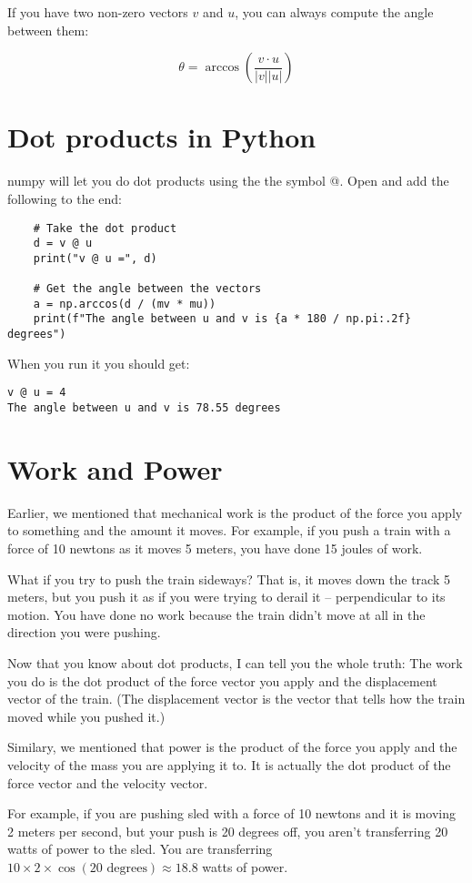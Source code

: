 If you have two non-zero vectors $v$ and $u$, you can always compute the angle between them:

$$\theta = \arccos(\frac{v \cdot u}{|v| |u|})$$

\section{Dot products in Python}

numpy will let you do dot products using the the symbol @.  Open  
and add the following to the end:

\begin{Verbatim}
    # Take the dot product
    d = v @ u
    print("v @ u =", d)
    
    # Get the angle between the vectors
    a = np.arccos(d / (mv * mu))
    print(f"The angle between u and v is {a * 180 / np.pi:.2f} degrees")    
\end{Verbatim}

When you run it you should get:
\begin{Verbatim}
v @ u = 4
The angle between u and v is 78.55 degrees
\end{Verbatim}

\section{Work and Power}

Earlier, we mentioned that mechanical work is the product of the 
force you apply to something and the amount it moves. For example, if you 
push a train with a force of 10 newtons as it moves 5 meters, you have done 15 joules of work.

What if you try to push the train sideways? That is, it moves down the track 5 meters, 
but you push it as if you were trying to derail it -- perpendicular to its motion.  
You have done no work because the train didn't move at all in the direction you were pushing.

Now that you know about dot products, I can tell you the whole truth: The work you do is the dot
product of the force vector you apply and the displacement vector of the train. (The displacement
vector is the vector that tells how the train moved while you pushed it.) 

Similary, we mentioned that power is the product of the force you apply and the velocity of the
mass you are applying it to. It is actually the dot product of the force vector and the velocity vector.

For example, if you are pushing sled with a force of 10 newtons and it is moving 2 meters per second, 
but your push is 20 degrees off, you aren't transferring 20 watts of power to the sled.  
You are transferring $10 \times 2 \times \cos(20 \text{ degrees}) \approx 18.8$ watts of power.
